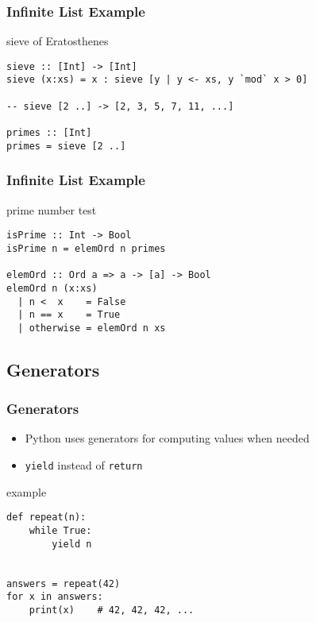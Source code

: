 \documentclass[dvipsnames]{beamer}
\theoremstyle{plain}
\begin{document}
\begin{frame}[fragile]
  \frametitle{Infinite List Example}

  \begin{exampleblock}{sieve of Eratosthenes}
    \begin{lstlisting}
sieve :: [Int] -> [Int]
sieve (x:xs) = x : sieve [y | y <- xs, y `mod` x > 0]

-- sieve [2 ..] -> [2, 3, 5, 7, 11, ...]

primes :: [Int]
primes = sieve [2 ..]
    \end{lstlisting}
  \end{exampleblock}
\end{frame}

\begin{frame}[fragile]
  \frametitle{Infinite List Example}

  \begin{exampleblock}{prime number test}
    \begin{lstlisting}
isPrime :: Int -> Bool
isPrime n = elemOrd n primes

elemOrd :: Ord a => a -> [a] -> Bool
elemOrd n (x:xs)
  | n <  x    = False
  | n == x    = True
  | otherwise = elemOrd n xs
    \end{lstlisting}
  \end{exampleblock}
\end{frame}

\subsection{Generators}


\begin{frame}[fragile]
  \frametitle{Generators}

  \begin{itemize}
    \item Python uses generators for computing values when needed
    \item \lstinline|yield| instead of \lstinline|return|
  \end{itemize}

  \begin{exampleblock}{example}
    \begin{lstlisting}
def repeat(n):
    while True:
        yield n


answers = repeat(42)
for x in answers:
    print(x)    # 42, 42, 42, ...
    \end{lstlisting}
  \end{exampleblock}
\end{frame}
\end{document}
